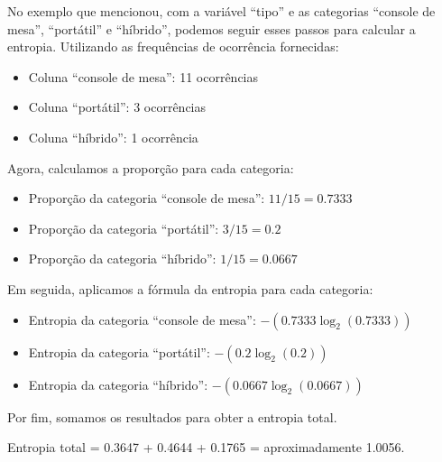 No exemplo que mencionou, com a variável ``tipo'' e as categorias ``console de mesa'', ``portátil'' e ``híbrido'', podemos seguir esses passos para calcular a entropia. Utilizando as frequências de ocorrência fornecidas:

\begin{itemize}
  \item \hspace{0.5cm} Coluna ``console de mesa'': 11 ocorrências
  \item \hspace{0.5cm} Coluna ``portátil'': 3 ocorrências
  \item \hspace{0.5cm} Coluna ``híbrido'': 1 ocorrência
\end{itemize}

\newpage

Agora, calculamos a proporção para cada categoria:

\begin{itemize}
  \item \hspace{0.5cm} Proporção da categoria ``console de mesa'': $11/15 = 0.7333$
  \item \hspace{0.5cm} Proporção da categoria ``portátil'': $3/15 = 0.2$
  \item \hspace{0.5cm} Proporção da categoria ``híbrido'': $1/15 = 0.0667$
\end{itemize}

Em seguida, aplicamos a fórmula da entropia para cada categoria:

\begin{itemize}
  \item \hspace{0.5cm} Entropia da categoria ``console de mesa'': $- (0.7333 \log_2(0.7333))$
  \item \hspace{0.5cm} Entropia da categoria ``portátil'': $- (0.2 \log_2(0.2))$
  \item \hspace{0.5cm} Entropia da categoria ``híbrido'': $- (0.0667 \log_2(0.0667))$
\end{itemize}

Por fim, somamos os resultados para obter a entropia total.

\begin{center}
Entropia total = 0.3647 + 0.4644 + 0.1765 = aproximadamente 1.0056.
\end{center}


